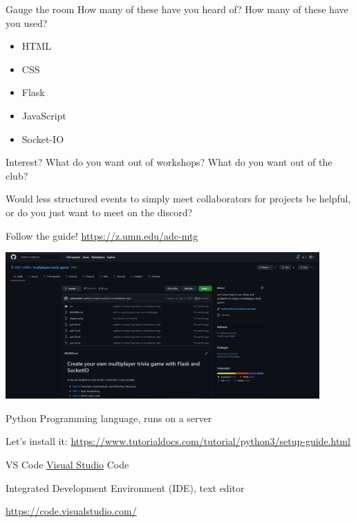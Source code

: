 \documentclass{beamer}
\begin{document}
\begin{frame}{Gauge the room}
	How many of these have you heard of? How many of these have you used?

	\begin{itemize}
		\item HTML
		\item CSS
		\item Flask
		\item JavaScript
		\item Socket-IO
	\end{itemize}
\end{frame}

\begin{frame}{Interest?}
	What do you want out of workshops? What do you want out of the club?

	\bigskip

	Would less structured events to simply meet collaborators for projects
	be helpful, or do you just want to meet on the discord?
\end{frame}

\begin{frame}{Follow the guide!}
	\centering
	\href{https://z.umn.edu/adc-mtg}{https://z.umn.edu/adc-mtg}

	\bigskip

	\includegraphics[width=0.9\textwidth]{guide.png}
\end{frame}

\begin{frame}{Python}
	Programming language, runs on a server

	\bigskip

	Let's install it: \href{https://www.tutorialdocs.com/tutorial/python3/setup-guide.html}{https://www.tutorialdocs.com/tutorial/python3/setup-guide.html}
\end{frame}

\begin{frame}{VS Code}
	\underline{Visual Studio} Code

	\bigskip

	Integrated Development Environment (IDE), text editor

	\bigskip

	\href{https://code.visualstudio.com/}{https://code.visualstudio.com/}
\end{frame}
\end{document}
